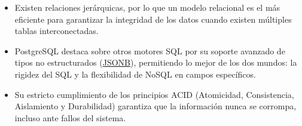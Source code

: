 \begin{itemize}
    \begin{itemize}
        \item Existen relaciones jerárquicas, por lo que un modelo relacional es el más eficiente para garantizar la integridad de los datos cuando existen múltiples 
        tablas interconectadas.
        \item PostgreSQL destaca sobre otros motores SQL por su soporte avanzado de tipos no estructurados (\hyperlink{jsonb}{JSONB}), permitiendo lo mejor de los dos 
        mundos: la rigidez del SQL y la flexibilidad de NoSQL en campos específicos.
        \item Su estricto cumplimiento de los principios ACID (Atomicidad, Consistencia, Aislamiento y Durabilidad) garantiza que la información nunca se corrompa, 
        incluso ante fallos del sistema.
    \end{itemize}
\end{itemize}
